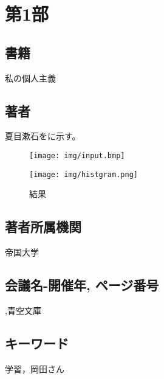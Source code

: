 \documentclass[../main]{subfiles}
\begin{document}
\section*{第1部}
\label{第1部}
  \subsection*{書籍}
  \noindent
  私の個人主義
  \subsection*{著者}
  夏目漱石をに示す。
  \begin{figure}[b]
      \begin{minipage}{0.45\linewidth}
          \centering
          \texttt{[image: img/input.bmp]}
          \label{fig:input}
      \end{minipage}
      \centering
      \begin{minipage}{0.45\linewidth}
          \centering
          \texttt{[image: img/histgram.png]}
          \label{fig:histgram}
      \end{minipage}
      \caption{結果}
  \end{figure}

  \subsection*{著者所属機関}
  帝国大学
  \subsection*{会議名-開催年, ページ番号}
  ,青空文庫
  \subsection*{キーワード}
  学習，岡田さん
\end{document}

